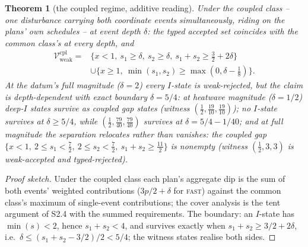 \documentclass[preprint,11pt,authoryear]{elsarticle}
\newtheorem{theorem}{Theorem}
\theoremstyle{remark}
\newcommand{\Vweak}{\mathcal{V}_{\mathrm{weak}}}
\newcommand{\act}[1]{\textsc{#1}}
\begin{document}
\begin{theorem}[the coupled regime, additive reading]\label{thm:coupled}
Under the coupled class -- one disturbance carrying both coordinate events simultaneously, riding on the plans' own schedules -- at event depth $\delta$: the typed accepted set coincides with the common class's at every depth, and
\begin{align*}
\Vweak^{\mathrm{cpl}}={}&\{x<1,\ s_1\ge\delta,\ s_2\ge\delta,\ s_1+s_2\ge\tfrac32+2\delta\}\\
&\cup\{x\ge1,\ \min(s_1,s_2)\ge\max(0,\delta-\tfrac18)\}.
\end{align*}
At the datum's full magnitude ($\delta=2$) every $I$-state is weak-rejected, but the claim is depth-dependent with exact boundary $\delta=5/4$: at heatwave magnitude ($\delta=1/2$) deep-$I$ states survive as coupled gap states (witness $(\tfrac12,\tfrac{19}{10},\tfrac{19}{10})$); no $I$-state survives at $\delta\ge5/4$, while $(\tfrac12,\tfrac{79}{40},\tfrac{79}{40})$ survives at $\delta=5/4-1/40$; and at full magnitude the separation relocates rather than vanishes: the coupled gap $\{x<1,\ 2\le s_1<\tfrac72,\ 2\le s_2<\tfrac72,\ s_1+s_2\ge\tfrac{11}2\}$ is nonempty (witness $(\tfrac12,3,3)$ is weak-accepted and typed-rejected).
\end{theorem}
\begin{proof}[Proof sketch]
Under the coupled class each plan's aggregate dip is the sum of both events' weighted contributions ($3p/2+\delta$ for \act{fast}) against the common class's maximum of single-event contributions; the cover analysis is the tent argument of S2.4 with the summed requirements. The boundary: an $I$-state has $\min(s)<2$, hence $s_1+s_2<4$, and survives exactly when $s_1+s_2\ge3/2+2\delta$, i.e.\ $\delta\le(s_1+s_2-3/2)/2<5/4$; the witness states realise both sides.
\end{proof}
\end{document}

